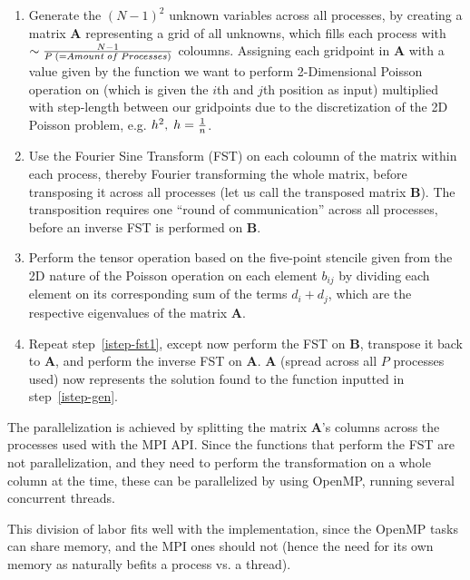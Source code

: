 \documentclass[fontsize=11pt,paper=a4,titlepage]{article}
\begin{document}
\begin{enumerate}

	\item \label{istep-gen} Generate the $(N - 1)^2$ unknown variables across
	all processes, by creating a matrix $\mathbf{A}$ representing a grid of all
	unknowns, which fills each process with $\sim \frac{N-1}{P \thickspace (=
	Amount 	\thickspace of\thickspace Processes)}$ coloumns. Assigning each
	gridpoint in $\mathbf{A}$ with a value given by the function we want to
	perform 2-Dimensional Poisson operation on (which is given the $i$th and
	$j$th position as input) multiplied with step-length between our gridpoints
	due to the discretization of the 2D Poisson problem, e.g. $h^2, \thickspace
	h = \frac{1}{n}$.

	\item \label{istep-fst1} Use the Fourier Sine Transform (FST) on each
	coloumn of the matrix within each process, thereby Fourier transforming the
	whole matrix, before transposing it across all processes (let us call the
	transposed matrix $\mathbf{B}$). The transposition requires one ``round
	of communication'' across all processes, before an inverse FST is performed
	on $\mathbf{B}$.

	\item \label{istep-tens} Perform the tensor operation based on the
	five-point stencile given from the 2D nature of the Poisson operation on
	each element $b_{ij}$ by dividing each element on its corresponding sum of
	the terms $d_i + d_j$, which are the respective eigenvalues of the matrix $
	\mathbf{A}$.

	\item \label{istep-fst2} Repeat step~\ref{istep-fst1}, except now perform
	the FST on $\mathbf{B}$, transpose it back to $\mathbf{A}$, and perform the
	inverse FST on $\mathbf{A}$. $\mathbf{A}$ (spread across all $P$ processes
	used) now represents the solution found to the function inputted in
	step~\ref{istep-gen}.

\end{enumerate}

The parallelization is achieved by splitting the matrix $\mathbf{A}$'s columns
across the processes used with the MPI API. Since the functions that perform the
FST are not parallelization, and they need to perform the transformation on a
whole column at the time, these can be parallelized by using OpenMP, running
several concurrent threads.

This division of labor fits well with the implementation, since the OpenMP tasks
can share memory, and the MPI ones should not (hence the need for its own memory
as naturally befits a process vs. a thread).
\end{document}

